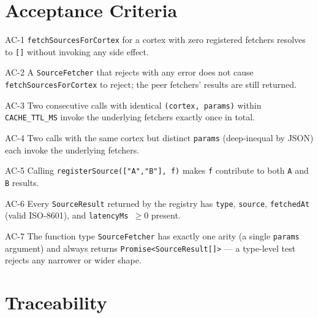 \section{Acceptance Criteria}

\begin{ac}{AC-1}
\texttt{fetchSourcesForCortex} for a cortex with zero registered fetchers resolves to \texttt{[]} without invoking any side effect.
\end{ac}

\begin{ac}{AC-2}
A \texttt{SourceFetcher} that rejects with any error does not cause \texttt{fetchSourcesForCortex} to reject; the peer fetchers' results are still returned.
\end{ac}

\begin{ac}{AC-3}
Two consecutive calls with identical \texttt{(cortex, params)} within \texttt{CACHE\_TTL\_MS} invoke the underlying fetchers exactly once in total.
\end{ac}

\begin{ac}{AC-4}
Two calls with the same cortex but distinct \texttt{params} (deep-inequal by JSON) each invoke the underlying fetchers.
\end{ac}

\begin{ac}{AC-5}
Calling \texttt{registerSource(["A","B"], f)} makes \texttt{f} contribute to both \texttt{A} and \texttt{B} results.
\end{ac}

\begin{ac}{AC-6}
Every \texttt{SourceResult} returned by the registry has \texttt{type}, \texttt{source}, \texttt{fetchedAt} (valid ISO-8601), and \texttt{latencyMs \(\ge 0\)} present.
\end{ac}

\begin{ac}{AC-7}
The function type \texttt{SourceFetcher} has exactly one arity (a single \texttt{params} argument) and always returns \texttt{Promise<SourceResult[]>} --- a type-level test rejects any narrower or wider shape.
\end{ac}

\section{Traceability}

